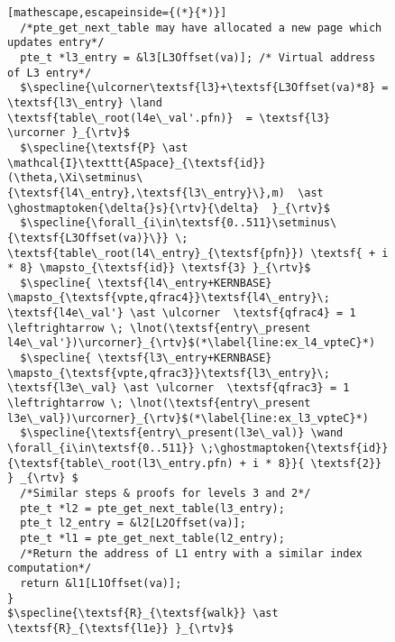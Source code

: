 \begin{figure}
\begin{lstlisting}[mathescape,escapeinside={(*}{*)}]
  /*pte_get_next_table may have allocated a new page which updates entry*/
  pte_t *l3_entry = &l3[L3Offset(va)]; /* Virtual address of L3 entry*/
  $\specline{\ulcorner\textsf{l3}+\textsf{L3Offset(va)*8} = \textsf{l3\_entry} \land \textsf{table\_root(l4e\_val'.pfn)}  = \textsf{l3} \urcorner }_{\rtv}$
  $\specline{\textsf{P} \ast \mathcal{I}\texttt{ASpace}_{\textsf{id}}(\theta,\Xi\setminus\{\textsf{l4\_entry},\textsf{l3\_entry}\},m)  \ast \ghostmaptoken{\delta{}s}{\rtv}{\delta}  }_{\rtv}$
  $\specline{\forall_{i\in\textsf{0..511}\setminus\{\textsf{L3Offset(va)}\}} \; \textsf{table\_root(l4\_entry}_{\textsf{pfn}}) \textsf{ + i * 8} \mapsto_{\textsf{id}} \textsf{3} }_{\rtv}$
  $\specline{ \textsf{l4\_entry+KERNBASE} \mapsto_{\textsf{vpte,qfrac4}}\textsf{l4\_entry}\; \textsf{l4e\_val'} \ast \ulcorner  \textsf{qfrac4} = 1 \leftrightarrow \; \lnot(\textsf{entry\_present l4e\_val'})\urcorner}_{\rtv}$(*\label{line:ex_l4_vpteC}*)
  $\specline{ \textsf{l3\_entry+KERNBASE} \mapsto_{\textsf{vpte,qfrac3}}\textsf{l3\_entry}\; \textsf{l3e\_val} \ast \ulcorner  \textsf{qfrac3} = 1 \leftrightarrow \; \lnot(\textsf{entry\_present l3e\_val})\urcorner}_{\rtv}$(*\label{line:ex_l3_vpteC}*)
  $\specline{\textsf{entry\_present(l3e\_val)} \wand \forall_{i\in\textsf{0..511}} \;\ghostmaptoken{\textsf{id}}{\textsf{table\_root(l3\_entry.pfn) + i * 8}}{ \textsf{2}} } _{\rtv} $
  /*Similar steps & proofs for levels 3 and 2*/
  pte_t *l2 = pte_get_next_table(l3_entry);
  pte_t l2_entry = &l2[L2Offset(va)];
  pte_t *l1 = pte_get_next_table(l2_entry);
  /*Return the address of L1 entry with a similar index computation*/
  return &l1[L1Offset(va)]; 
}
$\specline{\textsf{R}_{\textsf{walk}} \ast \textsf{R}_{\textsf{l1e}} }_{\rtv}$
\end{lstlisting}


\end{figure}
